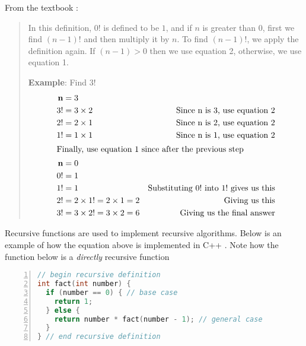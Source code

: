\documentclass[12pt]{article}
\theoremstyle{definition}
\theoremstyle{plain}
\begin{document}
        From the textbook \autocite{malik_2015}:
        \begin{quote}
          In this definition, $0!$ is defined to be $1$, and if $n$ is greater
            than $0$, first we find $(n-1)!$ and then multiply it by $n$. To
            find $(n-1)!$, we apply the definition again. If $(n-1)>0$ then we
            use equation 2, otherwise, we use equation 1.

          \begin{mdframed}[backgroundcolor=yellow!20]
            \textbf{Example}: Find $3!$
            \begin{align*}
              \mathbf{n} &= 3 \\
              3!         &= 3\times 2 &\text{Since n is 3, use equation 2} \\
              2!         &= 2\times 1 &\text{Since n is 2, use equation 2} \\
              1!         &= 1\times 1 &\text{Since n is 1, use equation 2} \\
              \shortintertext{Finally, use equation 1 since after the previous step}
              \mathbf{n} &= 0 \\
              0! &= 1 \\
              1! &= 1 & \text{Substituting $0!$ into $1!$ gives us this} \\
              2! &= 2\times 1!=2\times 1=2 & \text{Giving us this} \\
              3! &= 3\times 2!=3\times 2=6 & \text{Giving us the final answer}
            \end{align*}
          \end{mdframed}
        \end{quote}

        Recursive functions are used to implement recursive algorithms. Below is
          an example of how the equation above is implemented in C++
          \autocite{malik_2015}. Note how the function below is a
          \textit{directly} recursive function 

          \begin{lstlisting}[language=c++,caption=Factorial Function,numbers=left]
// begin recursive definition
int fact(int number) {
  if (number == 0) { // base case
    return 1;
  } else {
    return number * fact(number - 1); // general case
  }
} // end recursive definition
          \end{lstlisting}
\end{document}
